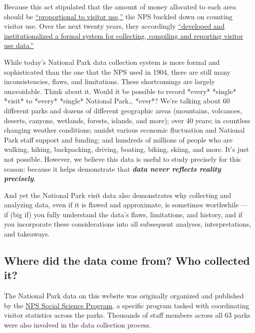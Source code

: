 \documentclass[
  letterpaper,
  DIV=11,
  numbers=noendperiod]{scrartcl}
\begin{document}
Because this act stipulated that the amount of money allocated to each
area should be
\href{https://www.nps.gov/subjects/socialscience/statistics-history.htm}{``proportional
to visitor use,''} the NPS buckled down on counting visitor use. Over
the next twenty years, they accordingly
\href{https://www.nps.gov/subjects/socialscience/statistics-history.htm}{``developed
and institutionalized a formal system for collecting, compiling and
reporting visitor use data.''}

While today's National Park data collection system is more formal and
sophisticated than the one that the NPS used in 1904, there are still
many inconsistencies, flaws, and limitations. These shortcomings are
largely unavoidable. Think about it. Would it be possible to record
*every* *single* *visit* to *every* *single* National Park\ldots{}
*ever*? We're talking about 60 different parks and dozens of different
geographic areas (mountains, volcanoes, deserts, canyons, wetlands,
forests, islands, and more); over 40 years; in countless changing
weather conditions; amidst various economic fluctuation and National
Park staff support and funding; and hundreds of millions of people who
are walking, hiking, backpacking, driving, boating, biking, skiing, and
more. It's just not possible. However, we believe this data is useful to
study precisely for this reason: because it helps demonstrate that
\textbf{\emph{data never reflects reality precisely}}.

And yet the National Park visit data also demonstrates why collecting
and analyzing data, even if it is flawed and approximate, is sometimes
worthwhile --- if (big if) you fully understand the data's flaws,
limitations, and history, and if you incorporate these considerations
into all subsequent analyses, interpretations, and takeaways.

\subsection{Where did the data come from? Who collected
it?}\label{where-did-the-data-come-from-who-collected-it}

The National Park data on this website was originally organized and
published by the
\href{https://www.nps.gov/subjects/socialscience/visitor-use-statistics.htm}{NPS
Social Science Program}, a specific program tasked with coordinating
visitor statistics across the parks. Thousands of staff members across
all 63 parks were also involved in the data collection process.
\end{document}
